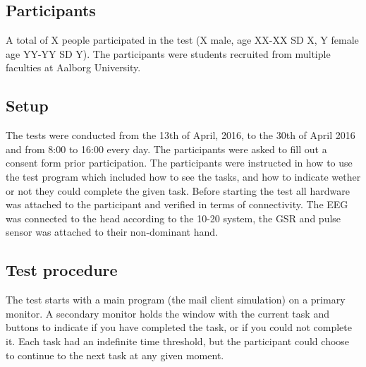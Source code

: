 \subsection{Participants}
A total of X people participated in the test (X male, age XX-XX SD X, Y female age YY-YY SD Y).
The participants were students recruited from multiple faculties at Aalborg University.

\subsection{Setup}
The tests were conducted from the 13th of April, 2016, to the 30th of April 2016 and from 8:00 to 16:00 every day. 
The participants were asked to fill out a consent form prior participation. 
The participants were instructed in how to use the test program which included how to see the tasks, and how to indicate wether or not they could complete the given task. 
Before starting the test all hardware was attached to the participant and verified in terms of connectivity. 
The EEG was connected to the head according to the 10-20 system\cite{eeg_tech_10_20}, the GSR and pulse sensor was attached to their non-dominant hand. 

\subsection{Test procedure}
The test starts with a main program (the mail client simulation) on a primary monitor. 
A secondary monitor holds the window with the current task and buttons to indicate if you have completed the task, or if you could not complete it. 
Each task had an indefinite time threshold, but the participant could choose to continue to the next task at any given moment. 